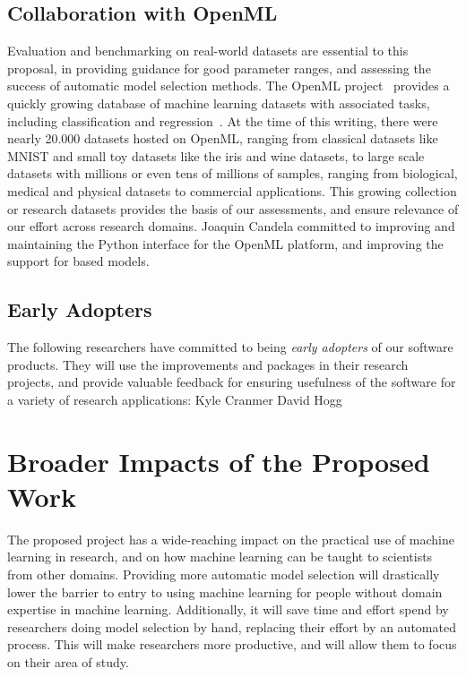\subsection{Collaboration with OpenML}
Evaluation and benchmarking on real-world datasets are essential to this
proposal, in providing guidance for good parameter ranges, and assessing the
success of automatic model selection methods. The OpenML
project~\autocite{van2013openml} provides a quickly growing database of machine
learning datasets with associated tasks, including classification and
regression~\autocite{vanschoren2014openml}. At the time of this writing, there
were nearly 20.000 datasets hosted on OpenML, ranging from classical datasets
like MNIST and small toy datasets like the iris and wine datasets, to large
scale datasets with millions or even tens of millions of samples, ranging from
biological, medical and physical datasets to commercial applications. This
growing collection or research datasets provides the basis of our assessments,
and ensure relevance of our effort across research domains.  Joaquin Candela
committed to improving and maintaining the Python interface for the OpenML
platform, and improving the support for \sklearn{} based models.

\subsection{Early Adopters}
The following researchers have committed to being \emph{early adopters} of our software
products. They will use the improvements and packages in their research projects,
and provide valuable feedback for ensuring usefulness of the software for a
variety of research applications:
Kyle Cranmer
David Hogg

\section{Broader Impacts of the Proposed Work}
The proposed project has a wide-reaching impact on the practical use of
machine learning in research, and on how machine learning can be taught to
 scientists from other domains.
Providing more automatic model selection will drastically lower the barrier
to entry to using machine learning for people without domain expertise
in machine learning.
Additionally, it will save time and effort spend by researchers doing
model selection by hand, replacing their effort by an automated process.
This will make researchers more productive, and will allow them to focus
on their area of study.

